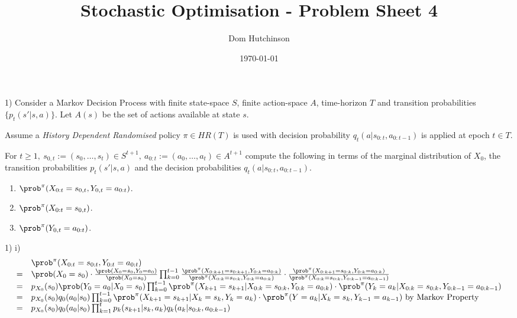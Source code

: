 \documentclass[11pt,a4paper]{article}
\begin{document}
\questionsfalse

\title{Stochastic Optimisation - Problem Sheet 4}
\author{Dom Hutchinson}
\date{\today}
\maketitle


\begin{question}{1)}
  Consider a Markov Decision Process with finite state-space $S$, finite action-space $A$, time-horizon $T$ and transition probabilities $\{p_t(s'|s,a)\}$. Let $A(s)$ be the set of actions available at state $s$.
  \par Assume a \textit{History Dependent Randomised} policy $\pi\in HR(T)$ is used with decision probability $q_t(a|s_{0:t},a_{0:t-1})$ is applied at epoch $t\in T$.
  \par For $t\geq1,\ s_{0,t}:=(s_0,\dots,s_t)\in S^{t+1},\ a_{0:t}:=(a_0,\dots,a_t)\in A^{t+1}$ compute the following in terms of the marginal distribution of $X_0$, the transition probabilities $p_t(s'|s,a)$ and the decision probabilities $q_t(a|s_{0:t},a_{0:t-1})$.
  \begin{enumerate}
    \item $\prob^\pi(X_{0:t}=s_{0,t},Y_{0,t}=a_{0:t})$.
    \item $\prob^\pi(X_{0:t}=s_{0,t})$.
    \item $\prob^\pi(Y_{0,t}=a_{0:t})$.
  \end{enumerate}
\end{question}

\begin{answer}{1) i)}
  \[\begin{array}{rl}
    &\prob^\pi(X_{0:t}=s_{0:t},Y_{0:t}=a_{0:t})\\
    =&\prob(X_0=s_0)\cdot\frac{\prob(X_0=s_0,Y_0=a_0)}{\prob(X_0=s_0)}\prod_{k=0}^{t-1}\frac{\prob^\pi(X_{0:k+1}=s_{0:k+1},Y_{0:k}=a_{0:k})}{\prob^\pi(X_{0:k}=s_{0:k},Y_{0:k}=a_{0:k})}\cdot\frac{\prob^\pi(X_{0:k+1}=s_{0:k},Y_{0:k}=a_{0:k})}{\prob^\pi(X_{0:k}=s_{0:k},Y_{0:k-1}=a_{0:k-1})}\\
    =&p_{X_0}(s_0)\prob(Y_0=a_0|X_0=s_0)\prod_{k=0}^{t-1}\prob^\pi(X_{k+1}=s_{k+1}|X_{0:k}=s_{0:k},Y_{0:k}=a_{0:k})\cdot\prob^\pi(Y_k=a_k|X_{0:k}=s_{0:k},Y_{0:k-1}=a_{0:k-1})\\
    =&p_{X_0}(s_0)q_0(a_0|s_0)\prod_{k=0}^{t-1}\prob^\pi(X_{k+1}=s_{k+1}|X_k=s_k,Y_k=a_k)\cdot\prob^\pi(Y=a_k|X_k=s_k,Y_{k-1}=a_{k-1})\text{ by Markov Property}\\
    =&p_{X_0}(s_0)q_0(a_0|s_0)\prod_{k=1}^tp_k(s_{k+1}|s_k,a_k)q_k(a_k|s_{0:k},a_{0:k-1})
  \end{array}\]
\end{answer}
\end{document}
